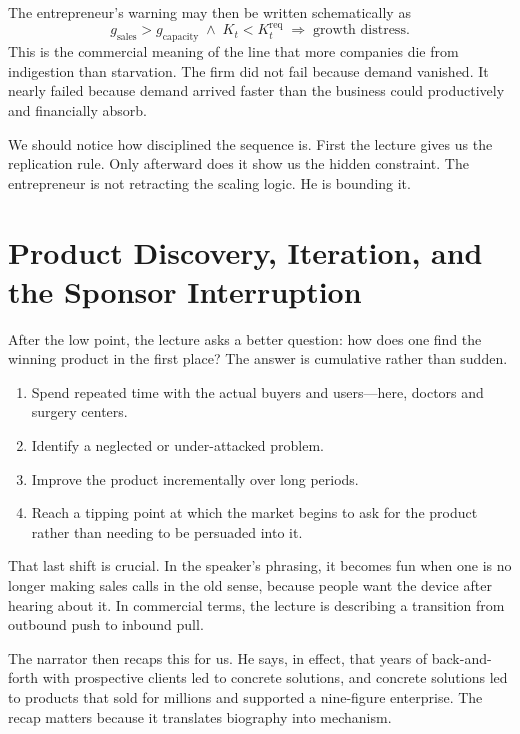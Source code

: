 The entrepreneur's warning may then be written schematically as
\begin{equation}
g_{\mathrm{sales}} > g_{\mathrm{capacity}}
\;\land\;
K_t < K_t^{\mathrm{req}}
\;\Rightarrow\;
\text{growth distress}.
\end{equation}
This is the commercial meaning of the line that more companies die from indigestion than starvation. The firm did not fail because demand vanished. It nearly failed because demand arrived faster than the business could productively and financially absorb.

We should notice how disciplined the sequence is. First the lecture gives us the replication rule. Only afterward does it show us the hidden constraint. The entrepreneur is not retracting the scaling logic. He is bounding it.

\section{Product Discovery, Iteration, and the Sponsor Interruption}

After the low point, the lecture asks a better question: how does one find the winning product in the first place? The answer is cumulative rather than sudden.

\begin{enumerate}
\item Spend repeated time with the actual buyers and users---here, doctors and surgery centers.
\item Identify a neglected or under-attacked problem.
\item Improve the product incrementally over long periods.
\item Reach a tipping point at which the market begins to ask for the product rather than needing to be persuaded into it.
\end{enumerate}

That last shift is crucial. In the speaker's phrasing, it becomes fun when one is no longer making sales calls in the old sense, because people want the device after hearing about it. In commercial terms, the lecture is describing a transition from outbound push to inbound pull.

The narrator then recaps this for us. He says, in effect, that years of back-and-forth with prospective clients led to concrete solutions, and concrete solutions led to products that sold for millions and supported a nine-figure enterprise. The recap matters because it translates biography into mechanism.

